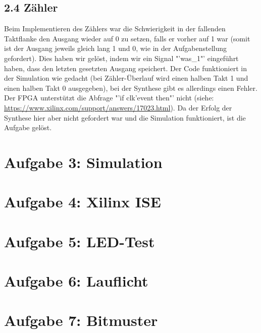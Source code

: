 \documentclass[parskip=full]{scrartcl}
\begin{document}
		\subsection*{2.4 Zähler}
			Beim Implementieren des Zählers war die Schwierigkeit in der fallenden Taktflanke den Ausgang wieder auf 0 zu setzen, falls er vorher auf 1 war (somit ist der Ausgang jeweils gleich lang 1 und 0, wie in der Aufgabenstellung gefordert). Dies haben wir gelöst, indem wir ein Signal "'was\_1"' eingeführt haben, dass den letzten gesetzten Ausgang speichert. Der Code funktioniert in der Simulation wie gedacht (bei Zähler-Überlauf wird einen halben Takt 1 und einen halben Takt 0 ausgegeben), bei der Synthese gibt es allerdings einen Fehler. Der FPGA unterstützt die Abfrage "'if clk'event then"' nicht (siehe: \url{https://www.xilinx.com/support/answers/17023.html}). Da der Erfolg der Synthese hier aber nicht gefordert war und die Simulation funktioniert, ist die Aufgabe gelöst.
	\section*{Aufgabe 3: Simulation}
	\section*{Aufgabe 4: Xilinx ISE}
	\section*{Aufgabe 5: LED-Test}
	\section*{Aufgabe 6: Lauflicht}
	\section*{Aufgabe 7: Bitmuster}
	
	
\end{document}
